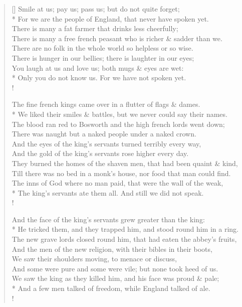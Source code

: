 \documentclass[MAIN]{subfiles}
\begin{document}
\settowidth{\versewidth}{There is many a free french peasant who is richer \& sadder than we.}
\begin{verse}[\versewidth]
Smile at us; pay us; pass us; but do not quite forget;\\*
For we are the people of England, that never have spoken yet.\\
There is many a fat farmer that drinks less cheerfully;\\
There is many a free french peasant who is richer \& sadder than we.\\
There are no folk in the whole world so helpless or so wise.\\
There is hunger in our bellies; there is laughter in our eyes;\\
You laugh at us and love us; both mugs \& eyes are wet:\\*
Only you do not know us. For we have not spoken yet.\\!

The fine french kings came over in a flutter of flags \& dames.\\*
We liked their smiles \& battles, but we never could say their names.\\
The blood ran red to {\sc Bosworth} and the high french lords went down;\\
There was naught but a naked people under a naked crown.\\
And the eyes of the king's servants turned terribly every way,\\
And the gold of the king's servants rose higher every day.\\
They burned the homes of the shaven men, that had been quaint \& kind,\\
Till there was no bed in a monk's house, nor food that man could find.\\
The inns of God where no man paid, that were the wall of the weak,\\*
The king's servants ate them all. And still we did not speak.\\!

And the face of the king's servants grew greater than the king:\\*
He tricked them, and they trapped him, and stood round him in a ring.\\
The new grave lords closed round him, that had eaten the abbey's fruits,\\
And the men of the new religion, with their bibles in their boots,\\
We saw their shoulders moving, to menace or discuss,\\
And some were pure and some were vile; but none took heed of us.\\
We saw the king as they killed him, and his face was proud \& pale;\\*
And a few men talked of freedom, while England talked of ale.\\!


\end{verse}
\end{document}
